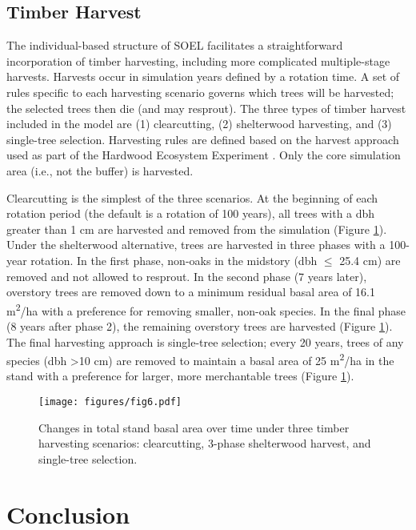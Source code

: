 \documentclass[
11pt, %
a4paper, %
oneside, %
headinclude,footinclude, %
]{scrartcl}
\begin{document}
\subsection{Timber Harvest}

The individual-based structure of SOEL facilitates a straightforward incorporation of timber harvesting, including more complicated multiple-stage harvests. Harvests occur in simulation years defined by a rotation time. A set of rules specific to each harvesting scenario governs which trees will be harvested; the selected trees then die (and may resprout). The three types of timber harvest included in the model are (1) clearcutting, (2) shelterwood harvesting, and (3) single-tree selection. Harvesting rules are defined based on the harvest approach used as part of the Hardwood Ecosystem Experiment \citep{Kalb2013}. Only the core simulation area (i.e., not the buffer) is harvested.

Clearcutting is the simplest of the three scenarios. At the beginning of each rotation period (the default is a rotation of 100 years), all trees with a dbh greater than 1 cm are harvested and removed from the simulation (Figure \ref{fig:6}). Under the shelterwood alternative, trees are harvested in three phases with a 100-year rotation. In the first phase, non-oaks in the midstory (dbh $\leq$ 25.4 cm) are removed and not allowed to resprout. In the second phase (7 years later), overstory trees are removed down to a minimum residual basal area of 16.1 m\textsuperscript{2}/ha with a preference for removing smaller, non-oak species. In the final phase (8 years after phase 2), the remaining overstory trees are harvested (Figure \ref{fig:6}). The final harvesting approach is single-tree selection; every 20 years, trees of any species (dbh \textgreater 10 cm) are removed to maintain a basal area of 25 m\textsuperscript{2}/ha in the stand with a preference for larger, more merchantable trees (Figure \ref{fig:6}).

\begin{figure}
	\centering
	\texttt{[image: figures/fig6.pdf]}
	\caption{Changes in total stand basal area over time under three timber harvesting scenarios: clearcutting, 3-phase shelterwood harvest, and single-tree selection.}
	\label{fig:6}
\end{figure}

\section{Conclusion}
\end{document}
